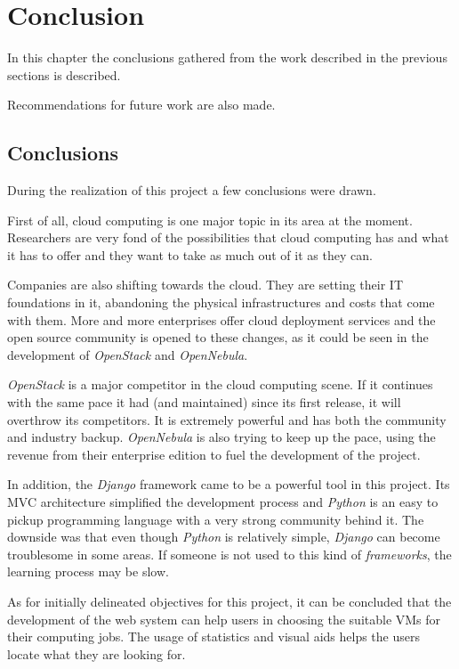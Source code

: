 \chapter{Conclusion} \label{chap:concl}

In this chapter the conclusions gathered from the work described in the previous sections is described. 

Recommendations for future work are also made.

\section{Conclusions}\label{sec:conclusions}

During the realization of this project a few conclusions were drawn.

First of all, cloud computing is one major topic in its area at the moment. Researchers are very fond of the possibilities that cloud computing has and what it has to offer and they want to take as much out of it as they can. 

Companies are also shifting towards the cloud. They are setting their IT foundations in it, abandoning the physical infrastructures and costs that come with them. More and more enterprises offer cloud deployment services and the open source community is opened to these changes, as it could be seen in the development of \textit{OpenStack} and \textit{OpenNebula}.

\textit{OpenStack} is a major competitor in the cloud computing scene. If it continues with the same pace it had (and maintained) since its first release, it will overthrow its competitors. It is extremely powerful and has both the community and industry backup. \textit{OpenNebula} is also trying to keep up the pace, using the revenue from their enterprise edition to fuel the development of the project.

In addition, the \textit{Django} framework came to be a powerful tool in this project. Its MVC architecture simplified the development process and \textit{Python} is an easy to pickup programming language with a very strong community behind it. The downside was that even though \textit{Python} is relatively simple, \textit{Django} can become troublesome in some areas. If someone is not used to this kind of \textit{frameworks}, the learning process may be slow.

As for initially delineated objectives for this project, it can be concluded that the development of the web system can help users in choosing the suitable VMs for their computing jobs. The usage of statistics and visual aids helps the users locate what they are looking for.

